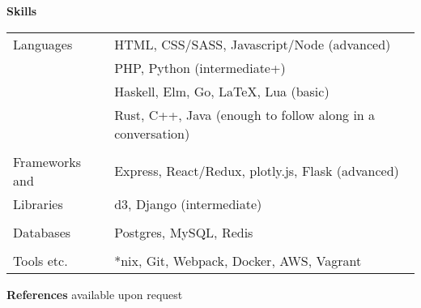 \documentclass[notitlepage,oneside,draft]{article}
\begin{document}
\begin{flushleft}
  \large
  \textbf{Skills} \\
  \vspace{12pt}
  \normalsize
  \begin{tabular}{ p{86pt} | l  }
    Languages & HTML, CSS/SASS, Javascript/Node (advanced) \\
    & PHP, Python (intermediate+) \\
    & Haskell, Elm, Go, LaTeX, Lua (basic) \\
    & Rust, C++, Java (enough to follow along in a conversation) \\
    & \\
    Frameworks and & Express, React/Redux, plotly.js, Flask (advanced) \\
    Libraries & d3, Django (intermediate) \\
    & \\
    Databases & Postgres, MySQL, Redis \\
    & \\
    Tools etc. & *nix, Git, Webpack, Docker, AWS, Vagrant 
  \end{tabular}
  \vspace{24pt}


  \large
  \textbf{References}
  \normalsize
  available upon request

\end{flushleft}
\end{document}

